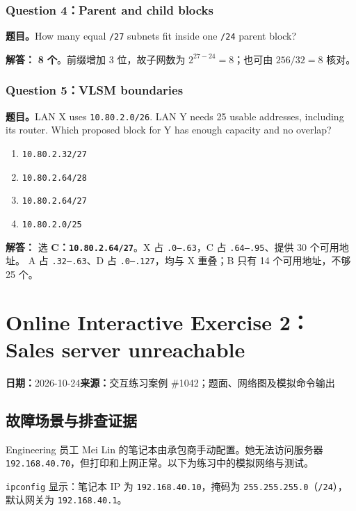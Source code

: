 \documentclass[11pt,a4paper,fontset=fandol]{ctexart}
\renewcommand{\exercisequestion}[2]{%
  \Needspace{5\baselineskip}%
  \subsubsection{#2}\label{exercise:#1}%
}
\renewcommand{\exercisemeta}[5]{%
  {\small\textbf{日期：}#2\quad\textbf{来源：}#3\par}%
}
\renewenvironment{checkedsolution}
  {\par\nopagebreak[4]\textbf{解答：}\ignorespaces}
  {\par}
\begin{document}
\exercisequestion{SC2008-HW01-Q11}{Question 4：Parent and child blocks}
\textbf{题目。}How many equal \texttt{/27} subnets fit inside one \texttt{/24} parent block?
\begin{checkedsolution}
\textbf{8 个}。前缀增加 3 位，故子网数为 $2^{27-24}=8$；也可由 $256/32=8$ 核对。
\end{checkedsolution}

\exercisequestion{SC2008-HW01-Q12}{Question 5：VLSM boundaries}
\textbf{题目。}LAN X uses \texttt{10.80.2.0/26}. LAN Y needs 25 usable addresses, including its router. Which proposed block for Y has enough capacity and no overlap?
\begin{enumerate}[label=\Alph*.,leftmargin=2.4em]
  \item \texttt{10.80.2.32/27}
  \item \texttt{10.80.2.64/28}
  \item \texttt{10.80.2.64/27}
  \item \texttt{10.80.2.0/25}
\end{enumerate}
\begin{checkedsolution}
选 \textbf{C：\texttt{10.80.2.64/27}}。X 占 \texttt{.0--.63}，C 占 \texttt{.64--.95}、提供 30 个可用地址。
A 占 \texttt{.32--.63}、D 占 \texttt{.0--.127}，均与 X 重叠；B 只有 14 个可用地址，不够 25 个。
\end{checkedsolution}

\clearpage
\section{Online Interactive Exercise 2：Sales server unreachable}
\label{homework:SC2008-HW02}
\exercisemeta
  {SC2008-HW02}
  {2026-10-24}
  {交互练习案例 \#1042；题面、网络图及模拟命令输出}
  {已完成；依据页面反馈与地址计算核对}
  {已确认完成}

\subsection{故障场景与排查证据}

Engineering 员工 Mei Lin 的笔记本由承包商手动配置。她无法访问服务器 \texttt{192.168.40.70}，但打印和上网正常。以下为练习中的模拟网络与测试。

\texttt{ipconfig} 显示：笔记本 IP 为 \texttt{192.168.40.10}，掩码为 \texttt{255.255.255.0}（\texttt{/24}），默认网关为 \texttt{192.168.40.1}。
\end{document}
